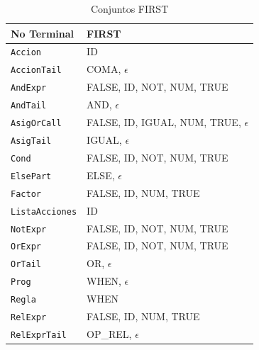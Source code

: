 \begin{table}[H]
\centering
\begin{tabular}{|l|l|}
\hline
\textbf{No Terminal} & \textbf{FIRST} \\ 
\hline
\texttt{Accion} & { ID } \\ 
\hline
\texttt{AccionTail} & { COMA, $\epsilon$ } \\ 
\hline
\texttt{AndExpr} & { FALSE, ID, NOT, NUM, TRUE } \\ 
\hline
\texttt{AndTail} & { AND, $\epsilon$ } \\ 
\hline
\texttt{AsigOrCall} & { FALSE, ID, IGUAL, NUM, TRUE, $\epsilon$ } \\ 
\hline
\texttt{AsigTail} & { IGUAL, $\epsilon$ } \\ 
\hline
\texttt{Cond} & { FALSE, ID, NOT, NUM, TRUE } \\ 
\hline
\texttt{ElsePart} & { ELSE, $\epsilon$ } \\ 
\hline
\texttt{Factor} & { FALSE, ID, NUM, TRUE } \\ 
\hline
\texttt{ListaAcciones} & { ID } \\ 
\hline
\texttt{NotExpr} & { FALSE, ID, NOT, NUM, TRUE } \\ 
\hline
\texttt{OrExpr} & { FALSE, ID, NOT, NUM, TRUE } \\ 
\hline
\texttt{OrTail} & { OR, $\epsilon$ } \\ 
\hline
\texttt{Prog} & { WHEN, $\epsilon$ } \\ 
\hline
\texttt{Regla} & { WHEN } \\ 
\hline
\texttt{RelExpr} & { FALSE, ID, NUM, TRUE } \\ 
\hline
\texttt{RelExprTail} & { OP\_REL, $\epsilon$ } \\ 
\hline
\end{tabular}
\caption{Conjuntos FIRST}
\label{tab:first}
\end{table}
